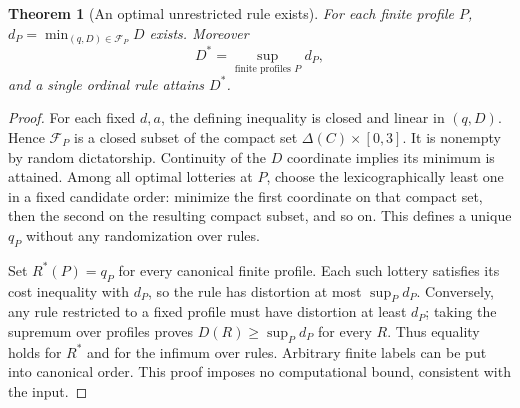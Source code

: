 \documentclass[11pt,a4paper]{article}
\newtheorem{theorem}{Theorem}[section]
\theoremstyle{definition}
\theoremstyle{remark}
\begin{document}
\begin{theorem}[An optimal unrestricted rule exists]
For each finite profile $P$, $d_P=\min_{(q,D)\in\mathcal F_P}D$ exists. Moreover
\[
 \boxed{\quad D^*=\sup_{\text{finite profiles }P}d_P,\quad}
\]
and a single ordinal rule attains $D^*$.
\end{theorem}
\begin{proof}
For each fixed $d,a$, the defining inequality is closed and linear in $(q,D)$. Hence $\mathcal F_P$ is a closed subset of the compact set $\Delta(C)\times[0,3]$. It is nonempty by random dictatorship. Continuity of the $D$ coordinate implies its minimum is attained. Among all optimal lotteries at $P$, choose the lexicographically least one in a fixed candidate order: minimize the first coordinate on that compact set, then the second on the resulting compact subset, and so on. This defines a unique $q_P$ without any randomization over rules.

Set $R^*(P)=q_P$ for every canonical finite profile. Each such lottery satisfies its cost inequality with $d_P$, so the rule has distortion at most $\sup_Pd_P$. Conversely, any rule restricted to a fixed profile must have distortion at least $d_P$; taking the supremum over profiles proves $D(R)\geq\sup_Pd_P$ for every $R$. Thus equality holds for $R^*$ and for the infimum over rules. Arbitrary finite labels can be put into canonical order. This proof imposes no computational bound, consistent with the input.
\end{proof}
\end{document}
